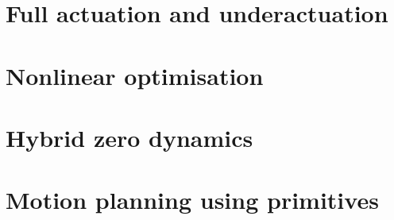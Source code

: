 \section{Full actuation and underactuation} \label{sec:underactuatedMaths}


\section{Nonlinear optimisation} \label{sec:nonlinopt}

\clearpage
\section{Hybrid zero dynamics}


\section{Motion planning using primitives}
 \label{sec:primplanning}